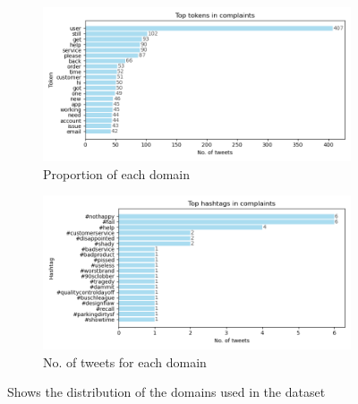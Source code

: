\begin{figure}[htbp]
    \centering
    \captionsetup{font=small}
    \begin{subfigure}{1\textwidth}
        \centering
        \includegraphics[width=\linewidth]{figures/top_token_horiz_bar.png}
        \caption{Proportion of each domain}
        \label{fig: domain_dist_pct}
    \end{subfigure}
    \hfill
    \begin{subfigure}{1\textwidth}
        \centering
        \includegraphics[width=\linewidth]{figures/top_hash_horiz_bar.png}
        \caption{No. of tweets for each domain}
        \label{fig: domain_dist_count}
    \end{subfigure}
    \caption{Shows the distribution of the domains used in the dataset}
    \label{fig: compl_main_dist}
\end{figure}



